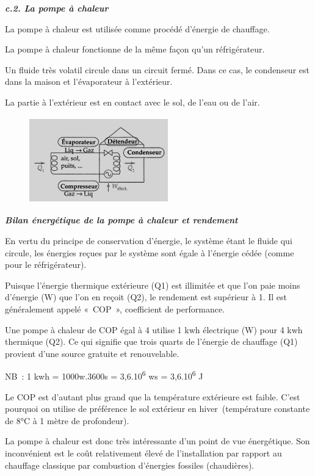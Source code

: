 \emph{\textbf{c.2. La pompe à chaleur}}

La pompe à chaleur est utilisée comme procédé d'énergie de chauffage.

La pompe à chaleur fonctionne de la même façon qu'un réfrigérateur.

Un fluide très volatil circule dans un circuit fermé. Dans ce cas, le
condenseur est dans la maison et l'évaporateur à l'extérieur.

La partie à l'extérieur est en contact avec le sol, de l'eau ou de
l'air.

\begin{figure}
\centering
\includegraphics[width=6.008cm,height=3.739cm]{Pictures/10000001000000E30000008754ECBE984DD7350E.png}
\caption{}
\end{figure}

\emph{\textbf{Bilan énergétique de la pompe à chaleur et rendement}}

En vertu du principe de conservation\textbf{ }d'énergie,\textbf{ }le
système étant le fluide qui circule, les énergies reçues par le système
sont égale à l'énergie cédée (comme pour le réfrigérateur).

Puisque l'énergie thermique extérieure (Q1) est illimitée et que l'on
paie moins d'énergie (W) que l'on en reçoit (Q2), le rendement est
supérieur à 1. Il est généralement appelé «~COP~», coefficient de
performance.

Une pompe à chaleur de COP égal à 4 utilise 1 kwh électrique (W) pour 4
kwh thermique (Q2). Ce qui signifie que trois quarts de l'énergie de
chauffage (Q1) provient d'une source gratuite et renouvelable.

NB~: 1 kwh = 1000w.3600s = 3,6.10\textsuperscript{6} ws =
3,6.10\textsuperscript{6} J

Le COP est d'autant plus grand que la température extérieure est faible.
C'est pourquoi on utilise de préférence le sol extérieur en
hiver~(température constante de 8°C à 1 mètre de profondeur).

La pompe à chaleur est donc très intéressante d'un point de vue
énergétique. Son inconvénient est le coût relativement élevé de
l'installation par rapport au chauffage classique par combustion
d'énergies fossiles (chaudières).

